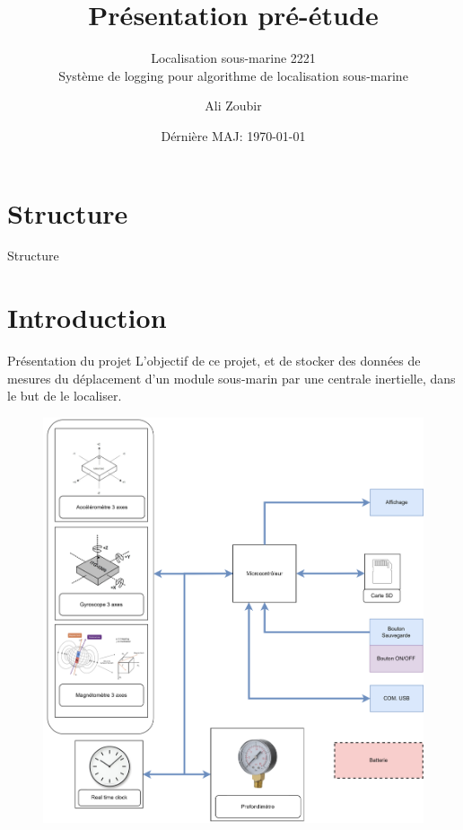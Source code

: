 \documentclass[compress,aspectratio=169]{beamer}
\title{Présentation pré-étude}
\subtitle{Localisation sous-marine 2221 \\ {\small Système de logging pour algorithme de localisation sous-marine}}
\date{Dérnière MAJ: \today}
\author{Ali Zoubir}
\institute{ETML-ES\\ {\Medium Génie électrique}}
\begin{document}

\maketitle


\section*{Structure}
\begin{frame}{Structure}
	\tableofcontents[hideallsubsections]
\end{frame}

\section{Introduction}

\begin{frame}{Présentation du projet}
	L'objectif de ce projet, et de stocker des données de mesures du déplacement d'un module sous-marin
	par une centrale inertielle, dans le but de le localiser.\vspace{-4pt}
	\begin{figure}
		\centering
		\includegraphics[width=0.4\linewidth]{Images/pre-etude.drawio}
	\end{figure}
	

\end{frame}
\end{document}
